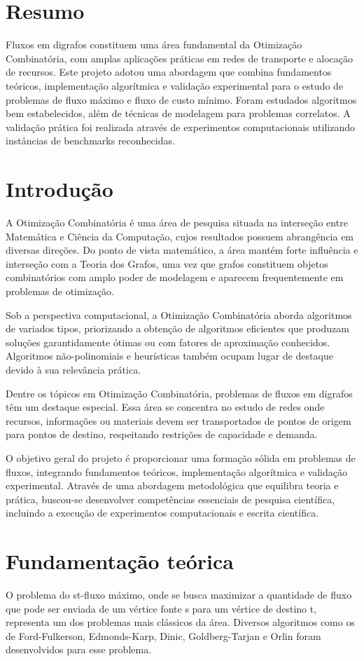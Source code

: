 \documentclass[12pt,a4paper]{article}
\begin{document}
\section{Resumo}
Fluxos em digrafos constituem uma área fundamental da Otimização Combinatória, com amplas aplicações práticas em redes de transporte e alocação de recursos. Este projeto adotou uma abordagem que combina fundamentos teóricos, implementação algorítmica e validação experimental para o estudo de problemas de fluxo máximo e fluxo de custo mínimo. Foram estudados algoritmos bem estabelecidos, além de técnicas de modelagem para problemas correlatos. A validação prática foi realizada através de experimentos computacionais utilizando instâncias de benchmarks reconhecidas.

\section{Introdução}
A Otimização Combinatória é uma área de pesquisa situada na interseção entre Matemática e Ciência da Computação, cujos resultados possuem abrangência em diversas direções. Do ponto de vista matemático, a área mantém forte influência e interseção com a Teoria dos Grafos, uma vez que grafos constituem objetos combinatórios com amplo poder de modelagem e aparecem frequentemente em problemas de otimização. 

Sob a perspectiva computacional, a Otimização Combinatória aborda algoritmos de variados tipos, priorizando a obtenção de algoritmos eficientes que produzam soluções garantidamente ótimas ou com fatores de aproximação conhecidos. Algoritmos não-polinomiais e heurísticas também ocupam lugar de destaque devido à sua relevância prática.

Dentre os tópicos em Otimização Combinatória, problemas de fluxos em digrafos têm um destaque especial. Essa área se concentra no estudo de redes onde recursos, informações ou materiais devem ser transportados de pontos de origem para pontos de destino, respeitando restrições de capacidade e demanda. 

O objetivo geral do projeto é proporcionar uma formação sólida em problemas de fluxos, integrando fundamentos teóricos, implementação algorítmica e validação experimental. Através de uma abordagem metodológica que equilibra teoria e prática, buscou-se desenvolver competências essenciais de pesquisa científica, incluindo a execução de experimentos computacionais e escrita científica.

\section{Fundamentação teórica}
O problema do st-fluxo máximo, onde se busca maximizar a quantidade de fluxo que pode ser enviada de um vértice fonte s para um vértice de destino t, representa um dos problemas mais clássicos da área. Diversos algoritmos como os de Ford-Fulkerson, Edmonds-Karp, Dinic, Goldberg-Tarjan e Orlin foram desenvolvidos para esse problema. 
\end{document}
